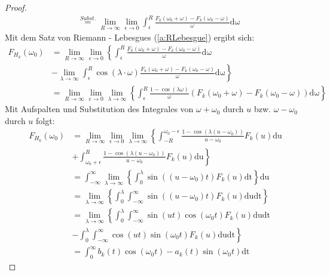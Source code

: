 \begin{lemma}
\begin{proof}
\begin{align}
		&\stackrel{Subst.}{=} \lim_{R \rightarrow \infty}\lim_{\epsilon \rightarrow 0}{\int_{\epsilon}^{R} \frac{F_k(\omega_0 + \omega)- F_k(\omega_0 - \omega)}{\omega} \mathrm{d\omega}}
		\end{align}
		Mit dem Satz von Riemann - Lebesgues (\ref{a:RLebesgue}) ergibt sich: 
		\begin{align}
		F_{H_k}(\omega_0) &= \lim_{R \rightarrow \infty}\lim_{\epsilon \rightarrow 0}\left\{\int_{\epsilon}^{R} \frac{F_k(\omega_0 + \omega)- F_k(\omega_0 - \omega)}{\omega} \mathrm{d\omega} \right. \\
		&- \left. \lim_{\lambda \rightarrow \infty} \int_{\epsilon}^{R} \cos(\lambda \cdot \omega) \frac{F_k(\omega_0 + \omega)- F_k(\omega_0 - \omega)}{\omega} \mathrm{d\omega}\right\} \\
		&= \lim_{R \rightarrow \infty}\lim_{\epsilon \rightarrow 0}\lim_{\lambda \rightarrow \infty}\left\{\int_{\epsilon}^{R} \frac{1-\cos(\lambda \omega)}{\omega} (F_k(\omega_0 + \omega)- F_k(\omega_0 - \omega)) \mathrm{d\omega}  \right\}
		\end{align}
		Mit Aufspalten und Substitution des Integrales von $\omega + \omega_0$ durch $u$ bzw. $\omega - \omega_0$ durch $u$ folgt:
		\begin{align}
		F_{H_k}(\omega_0) &= \lim_{R \rightarrow \infty}\lim_{\epsilon \rightarrow 0}\lim_{\lambda \rightarrow \infty}\left\{\int_{-R}^{\omega_0 - \epsilon} \frac{1-\cos(\lambda (u-\omega_0))}{u-\omega_0} F_k(u) \mathrm{du} \right. \\
		&\left. + \int_{\omega_0 + \epsilon}^{R} \frac{1-\cos(\lambda (u-\omega_0))}{u-\omega_0} F_k(u) \mathrm{du}  \right\} \\
		&= \int_{-\infty}^{\infty} \lim_{\lambda \rightarrow \infty} \left\{ \int_{0}^{\lambda} \sin((u-\omega_0) t) F_k(u) \mathrm{dt} \right\} \mathrm{du} \\		
		&=\lim_{\lambda \rightarrow \infty} \left\{ \int_0^{\lambda}  \int_{-\infty}^{\infty} \sin((u-\omega_0) t) F_k(u) \mathrm{du} \mathrm{dt} \right\}\\
		&= \lim_{\lambda \rightarrow \infty}\left\{ \int_{0}^{\lambda} \int_{-\infty}^{\infty} \sin(u t) \cos(\omega_0 t) F_k(u)  \mathrm{du} \mathrm{dt} \right.\\
		&- \left.\int_{0}^{\lambda} \int_{-\infty}^{\infty} \cos(u t) \sin(\omega_0 t) F_k(u)  \mathrm{du} \mathrm{dt} \right\}\\
		&= \int_{0}^{\infty} b_k(t) \cos(\omega_0 t)  - a_k(t) \sin(\omega_0 t)  \mathrm{dt} \label{ht:artIntegral2}
	\end{align}

\end{proof}
\end{lemma}
